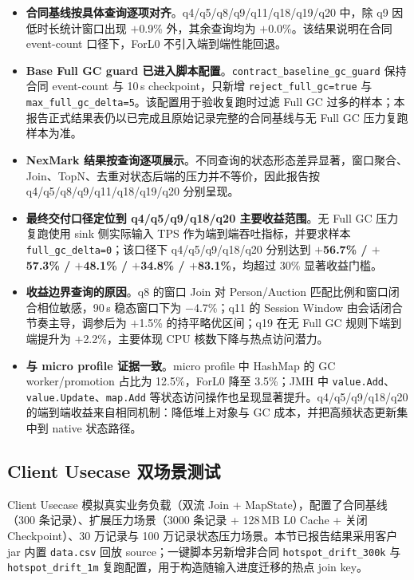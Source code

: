 \documentclass[a4paper,11pt]{article}
\begin{document}
\begin{itemize}
  \item \textbf{合同基线按具体查询逐项对齐}。q4/q5/q8/q9/q11/q18/q19/q20 中，除 q9 因低时长统计窗口出现 $+$0.9\% 外，其余查询均为 $+$0.0\%。该结果说明在合同 event-count 口径下，ForL0 不引入端到端性能回退。
  \item \textbf{Base Full GC guard 已进入脚本配置}。\texttt{contract\_baseline\_gc\_guard} 保持合同 event-count 与 10\,s checkpoint，只新增 \texttt{reject\_full\_gc=true} 与 \texttt{max\_full\_gc\_delta=5}。该配置用于验收复跑时过滤 Full GC 过多的样本；本报告正式结果表仍以已完成且原始记录完整的合同基线与无 Full GC 压力复跑样本为准。
  \item \textbf{NexMark 结果按查询逐项展示}。不同查询的状态形态差异显著，窗口聚合、Join、TopN、去重对状态后端的压力并不等价，因此报告按 q4/q5/q8/q9/q11/q18/q19/q20 分别呈现。
  \item \textbf{最终交付口径定位到 q4/q5/q9/q18/q20 主要收益范围}。无 Full GC 压力复跑使用 sink 侧实际输入 TPS 作为端到端吞吐指标，并要求样本 \texttt{full\_gc\_delta=0}；该口径下 q4/q5/q9/q18/q20 分别达到 \textbf{$+$56.7\% / $+$57.3\% / $+$48.1\% / $+$34.8\% / $+$83.1\%}，均超过 30\% 显著收益门槛。
  \item \textbf{收益边界查询的原因}。q8 的窗口 Join 对 Person/Auction 匹配比例和窗口闭合相位敏感，90\,s 稳态窗口下为 $-$4.7\%；q11 的 Session Window 由会话闭合节奏主导，调参后为 $+$1.5\% 的持平略优区间；q19 在无 Full GC 规则下端到端提升为 $+$2.2\%，主要体现 CPU 核数下降与热点访问潜力。
  \item \textbf{与 micro profile 证据一致}。micro profile 中 HashMap 的 GC worker/promotion 占比为 12.5\%，ForL0 降至 3.5\%；JMH 中 \texttt{value.Add}、\texttt{value.Update}、\texttt{map.Add} 等状态访问操作也呈现显著提升。q4/q5/q9/q18/q20 的端到端收益来自相同机制：降低堆上对象与 GC 成本，并把高频状态更新集中到 native 状态路径。
\end{itemize}

\subsection{Client Usecase 双场景测试}

Client Usecase 模拟真实业务负载（双流 Join + MapState），配置了合同基线（300 条记录）、扩展压力场景（3000 条记录 + 128\,MB L0 Cache + 关闭 Checkpoint）、30 万记录与 100 万记录状态压力场景。本节已报告结果采用客户 jar 内置 \texttt{data.csv} 回放 source；一键脚本另新增非合同 \texttt{hotspot\_drift\_300k} 与 \texttt{hotspot\_drift\_1m} 复跑配置，用于构造随输入进度迁移的热点 join key。
\end{document}
